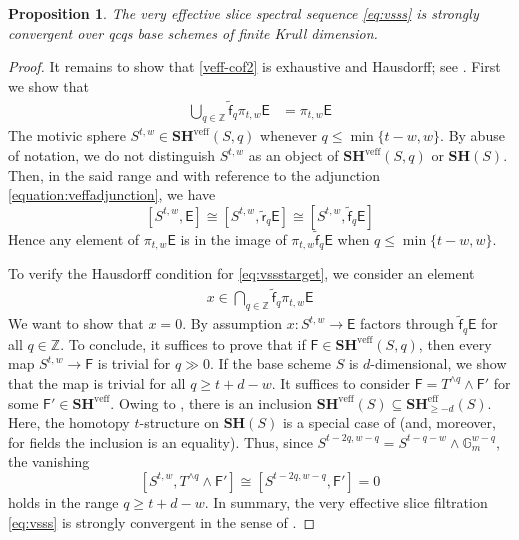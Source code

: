 \documentclass[11pt,hyp,english]{article}
\newcommand{\E}{\mathsf{E}}
\newcommand{\F}{\mathsf{F}}
\newcommand{\Z}{\mathbb{Z}}
\newcommand{\SH}{\mathbf{SH}}
\newcommand{\vf}{\tilde{{\mathsf{f}}}}
\newcommand{\eff}{\text{eff}}
\newcommand{\veff}{\text{veff}}
\newtheorem{proposition}[theorem]{Proposition}
\theoremstyle{definition}
\begin{document}
\begin{proposition}
\label{proposition:strongconvergence}
The very effective slice spectral sequence \eqref{eq:vsss} is strongly convergent 
over qcqs base schemes of finite Krull dimension.
\end{proposition}
\begin{proof}
It remains to show that \eqref{veff-cof2} is exhaustive and Hausdorff;
see \cite[Lemma 3.1]{zbMATH06957413}. 
First we show that
\begin{align}
\label{eq:conv1}
\bigcup_{q\in\Z}\vf_{q}\pi_{t,w}\E  & = \pi_{t,w}\E 
\end{align}
The motivic sphere $S^{t,w}\in\SH^\veff(S,q)$ whenever $q\leq\min\{t-w,w\}$.
By abuse of notation, we do not distinguish $S^{t,w}$ as an object of $\SH^\veff(S,q)$ or $\SH(S)$.
Then, 
in the said range and with reference to the adjunction \eqref{equation:veffadjunction}, 
we have 
\[
[S^{t,w}, \E] \cong
[S^{t,w}, \tilde{\mathsf{r}}_{q}\E ] \cong
[S^{t,w}, \vf_{q}\E ]
\]
Hence any element of $\pi_{t,w}\E $ is in the image of $\pi_{t,w}\vf_{q}\E $ when $q\leq\min\{t-w,w\}$.

To verify the Hausdorff condition \cite[Definition 5.2(ii)]{Boardman} for \eqref{eq:vssstarget}, 
we consider an element
\begin{align}
\label{eq:conv2}
x\in \bigcap_{q\in\Z}\vf_{q}\pi_{t,w}\E  
\end{align}
We want to show that $x=0$.
By assumption $x\colon S^{t,w}\to\E$ factors through 
$\vf_{q}\E $ for all $q\in\Z$.
To conclude, 
it suffices to prove that if $\F\in\SH^\veff(S,q)$,
then every map $S^{t,w}\to\F$ is trivial 
for $q\gg 0$.
If the base scheme $S$ is $d$-dimensional, 
we show that the map is trivial for all $q\ge t+d-w$.
It suffices to consider $\F=T^{\wedge q}\wedge\F'$ 
for some $\F'\in\SH^\veff$.
Owing to 
\cite[Subsection 1.2.3, Theorem 7.15]{DKO}, 
there is an inclusion 
$\SH^\veff(S)\subseteq \SH^\eff_{\geq -d}(S)$.
Here, 
the homotopy $t$-structure on $\SH(S)$ is a special case 
of \cite[Proposition 1.4.4.11]{HA}
(and, 
moreover, 
for fields the inclusion is an equality).
Thus, 
since $S^{t-2q,w-q}=S^{t-q-w}\wedge \mathbb{G}_{m}^{w-q}$, 
the vanishing 
$$
[S^{t,w},T^{\wedge q}\wedge \F']\cong [S^{t-2q,w-q},\F']=0
$$ 
holds in the range $q\ge t+d-w$.
In summary, 
the very effective slice filtration \eqref{eq:vsss} is strongly convergent in the sense of 
\cite[Definition 5.2 (iii)]{Boardman}.
\end{proof}
\end{document}
